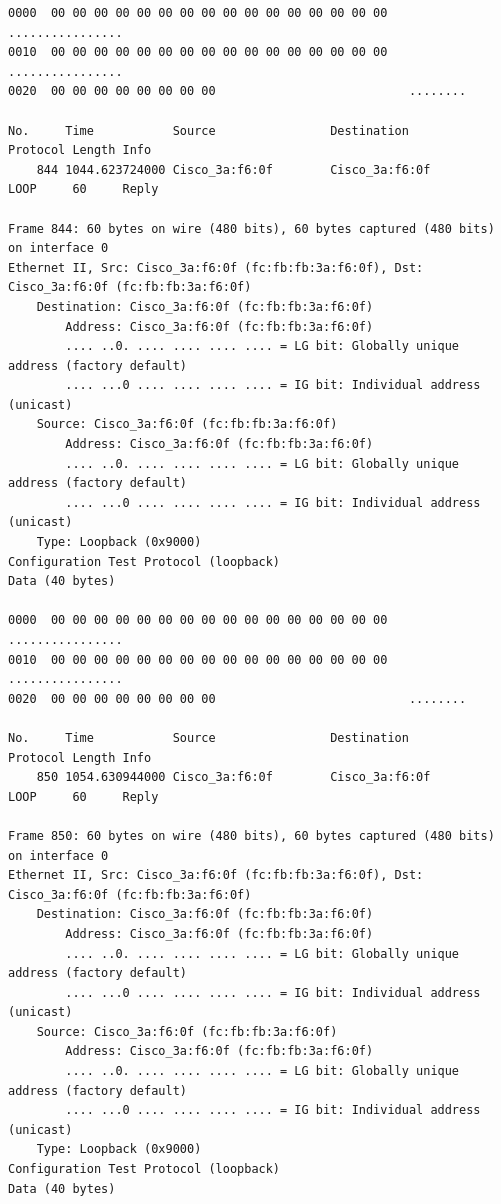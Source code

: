 \documentclass[a4paper,11pt]{article}
\begin{document}
\begin{lstlisting}
0000  00 00 00 00 00 00 00 00 00 00 00 00 00 00 00 00   ................
0010  00 00 00 00 00 00 00 00 00 00 00 00 00 00 00 00   ................
0020  00 00 00 00 00 00 00 00                           ........

No.     Time           Source                Destination           Protocol Length Info
    844 1044.623724000 Cisco_3a:f6:0f        Cisco_3a:f6:0f        LOOP     60     Reply

Frame 844: 60 bytes on wire (480 bits), 60 bytes captured (480 bits) on interface 0
Ethernet II, Src: Cisco_3a:f6:0f (fc:fb:fb:3a:f6:0f), Dst: Cisco_3a:f6:0f (fc:fb:fb:3a:f6:0f)
    Destination: Cisco_3a:f6:0f (fc:fb:fb:3a:f6:0f)
        Address: Cisco_3a:f6:0f (fc:fb:fb:3a:f6:0f)
        .... ..0. .... .... .... .... = LG bit: Globally unique address (factory default)
        .... ...0 .... .... .... .... = IG bit: Individual address (unicast)
    Source: Cisco_3a:f6:0f (fc:fb:fb:3a:f6:0f)
        Address: Cisco_3a:f6:0f (fc:fb:fb:3a:f6:0f)
        .... ..0. .... .... .... .... = LG bit: Globally unique address (factory default)
        .... ...0 .... .... .... .... = IG bit: Individual address (unicast)
    Type: Loopback (0x9000)
Configuration Test Protocol (loopback)
Data (40 bytes)

0000  00 00 00 00 00 00 00 00 00 00 00 00 00 00 00 00   ................
0010  00 00 00 00 00 00 00 00 00 00 00 00 00 00 00 00   ................
0020  00 00 00 00 00 00 00 00                           ........

No.     Time           Source                Destination           Protocol Length Info
    850 1054.630944000 Cisco_3a:f6:0f        Cisco_3a:f6:0f        LOOP     60     Reply

Frame 850: 60 bytes on wire (480 bits), 60 bytes captured (480 bits) on interface 0
Ethernet II, Src: Cisco_3a:f6:0f (fc:fb:fb:3a:f6:0f), Dst: Cisco_3a:f6:0f (fc:fb:fb:3a:f6:0f)
    Destination: Cisco_3a:f6:0f (fc:fb:fb:3a:f6:0f)
        Address: Cisco_3a:f6:0f (fc:fb:fb:3a:f6:0f)
        .... ..0. .... .... .... .... = LG bit: Globally unique address (factory default)
        .... ...0 .... .... .... .... = IG bit: Individual address (unicast)
    Source: Cisco_3a:f6:0f (fc:fb:fb:3a:f6:0f)
        Address: Cisco_3a:f6:0f (fc:fb:fb:3a:f6:0f)
        .... ..0. .... .... .... .... = LG bit: Globally unique address (factory default)
        .... ...0 .... .... .... .... = IG bit: Individual address (unicast)
    Type: Loopback (0x9000)
Configuration Test Protocol (loopback)
Data (40 bytes)


\end{lstlisting}
\end{document}
